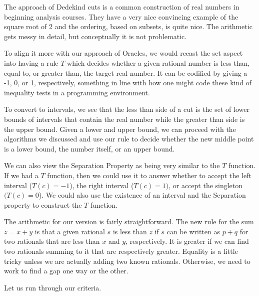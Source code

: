 \documentclass[12pt]{article}
\begin{document}
The approach of Dedekind cuts is a common construction of real numbers in beginning analysis courses. They have a very nice convincing example of the square root of 2 and the ordering, based on subsets, is quite nice. The arithmetic gets messy in detail, but conceptually it is not problematic. 

To align it more with our approach of Oracles, we would recast the set aspect into having a rule $T$ which decides whether a given rational number is less than, equal to, or greater than, the target real number. It can be codified by giving a -1, 0, or 1,  respectively, something in line with how one might code these kind of inequality tests in a programming environment. 

To convert to intervals, we see that the less than side of a cut is the set of lower bounds of intervals that contain the real number while the greater than side is the upper bound. Given a lower and upper bound, we can proceed with the algorithms we discussed and use our rule to decide whether the new middle point is a lower bound, the number itself, or an upper bound. 

We can also view the Separation Property as being very similar to the $T$ function. If we had a $T$ function, then we could use it to answer whether to accept the left interval ($T(c) = -1$), the right interval ($T(c)=1)$, or accept the singleton $(T(c) = 0$). We could also use the existence of an interval and the Separation property to construct the $T$ function.

The arithmetic for our version is fairly straightforward. The new rule for the sum  $z = x+y$ is that a given rational $s$ is less than $z$ if $s$ can be written as $p+q$ for two rationals that are less than $x$ and $y$, respectively. It is greater if we can find two rationals summing to it that are respectively greater. Equality is a little tricky unless we are actually adding two known rationals. Otherwise, we need to work to find a gap one way or the other. 

Let us run through our criteria. 
\end{document}
